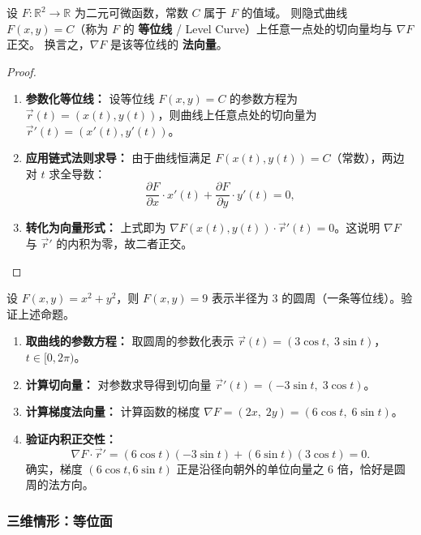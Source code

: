 \documentclass[lang=cn,11pt]{elegantbook}
\begin{document}
\begin{proposition}[梯度垂直于等位线] \label{prop:gradient-level-set-perp}
设 $F:\mathbb R^2\to\mathbb R$ 为二元可微函数，常数 $C$ 属于 $F$ 的值域。
则隐式曲线 $F(x,y)=C$（称为 $F$ 的 \textbf{等位线} / Level Curve）上任意一点处的切向量均与 $\nabla F$ 正交。
换言之，$\nabla F$ 是该等位线的 \textbf{法向量}。
\end{proposition}

\begin{proof}
\begin{enumerate}
  \item \textbf{参数化等位线：} 设等位线 $F(x,y)=C$ 的参数方程为 $\vec r(t)=(x(t),y(t))$，则曲线上任意点处的切向量为 $\vec r'(t)=(x'(t),y'(t))$。
  \item \textbf{应用链式法则求导：} 由于曲线恒满足 $F(x(t),y(t))=C$（常数），两边对 $t$ 求全导数：
  \[
  \frac{\partial F}{\partial x}\cdot x'(t)+\frac{\partial F}{\partial y}\cdot y'(t)=0,
  \]
  \item \textbf{转化为向量形式：} 上式即为 $\nabla F(x(t),y(t))\cdot\vec r'(t)=0$。这说明 $\nabla F$ 与 $\vec r'$ 的内积为零，故二者正交。
\end{enumerate}
\end{proof}

\begin{example}[圆周的梯度法向量] \label{ex:circle-level-normal}
设 $F(x,y)=x^2+y^2$，则 $F(x,y)=9$ 表示半径为 $3$ 的圆周（一条等位线）。验证上述命题。
\end{example}

\begin{solution}
\begin{enumerate}
  \item \textbf{取曲线的参数方程：} 取圆周的参数化表示 $\vec r(t)=(3\cos t,\;3\sin t)$，$t\in[0,2\pi)$。
  \item \textbf{计算切向量：} 对参数求导得到切向量 $\vec r'(t)=(-3\sin t,\;3\cos t)$。
  \item \textbf{计算梯度法向量：} 计算函数的梯度 $\nabla F=(2x,\;2y)=(6\cos t,\;6\sin t)$。
  \item \textbf{验证内积正交性：} 
  \[
  \nabla F\cdot\vec r'=(6\cos t)(-3\sin t)+(6\sin t)(3\cos t)=0.
  \]
  确实，梯度 $(6\cos t,6\sin t)$ 正是沿径向朝外的单位向量之 $6$ 倍，恰好是圆周的法方向。
\end{enumerate}
\end{solution}

\subsubsection*{三维情形：等位面}
\end{document}
